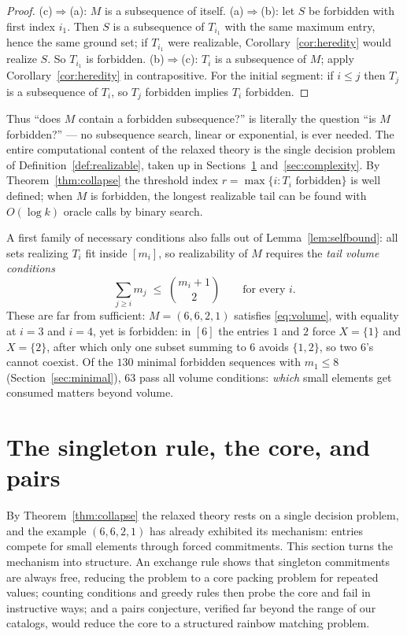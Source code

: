\documentclass[11pt]{article}
\theoremstyle{definition}
\theoremstyle{remark}
\newcommand{\intv}[1]{[#1]}
\begin{document}
\begin{proof}
(c)$\Rightarrow$(a): $M$ is a subsequence of itself.
(a)$\Rightarrow$(b): let $S$ be forbidden with first index $i_1$. Then $S$ is a
subsequence of $T_{i_1}$ with the same maximum entry, hence the same ground set; if
$T_{i_1}$ were realizable, Corollary~\ref{cor:heredity} would realize $S$. So
$T_{i_1}$ is forbidden.
(b)$\Rightarrow$(c): $T_i$ is a subsequence of $M$; apply
Corollary~\ref{cor:heredity} in contrapositive.
For the initial segment: if $i\le j$ then $T_j$ is a subsequence of $T_i$, so $T_j$
forbidden implies $T_i$ forbidden.
\end{proof}

Thus ``does $M$ contain a forbidden subsequence?'' is literally the question ``is
$M$ forbidden?'' --- no subsequence search, linear or exponential, is ever needed. The
entire computational content of the relaxed theory is the single decision problem of
Definition~\ref{def:realizable}, taken up in Sections~\ref{sec:singleton}
and~\ref{sec:complexity}. By Theorem~\ref{thm:collapse} the threshold index
$r=\max\{i:T_i\text{ forbidden}\}$ is well defined; when $M$ is forbidden, the longest
realizable tail can be found with $O(\log k)$ oracle calls by binary search.

A first family of necessary conditions also falls out of
Lemma~\ref{lem:selfbound}: all sets realizing $T_i$ fit inside $\intv{m_i}$, so
realizability of $M$ requires the \emph{tail volume conditions}
\begin{equation}\label{eq:volume}
\sum_{j\ge i} m_j \;\le\; \binom{m_i+1}{2}\qquad\text{for every } i.
\end{equation}
These are far from sufficient: $M=(6,6,2,1)$ satisfies \eqref{eq:volume}, with
equality at $i=3$ and $i=4$, yet is forbidden: in $\intv6$ the entries $1$ and $2$ force
$X=\{1\}$ and $X=\{2\}$, after which only one subset summing to $6$ avoids
$\{1,2\}$, so two $6$'s cannot coexist. Of the $130$ minimal forbidden sequences
with $m_1\le8$ (Section~\ref{sec:minimal}), $63$ pass all volume conditions:
\emph{which} small elements get consumed matters beyond volume.

\section{The singleton rule, the core, and pairs}\label{sec:singleton}

By Theorem~\ref{thm:collapse} the relaxed theory rests on a single decision
problem, and the example $(6,6,2,1)$ has already exhibited its mechanism: entries
compete for small elements through forced commitments. This section turns the
mechanism into structure. An exchange rule shows that singleton commitments are
always free, reducing the problem to a core packing problem for repeated values;
counting conditions and greedy rules then probe the core and fail in instructive
ways; and a pairs conjecture, verified far beyond the range of our catalogs,
would reduce the core to a structured rainbow matching problem.
\end{document}
